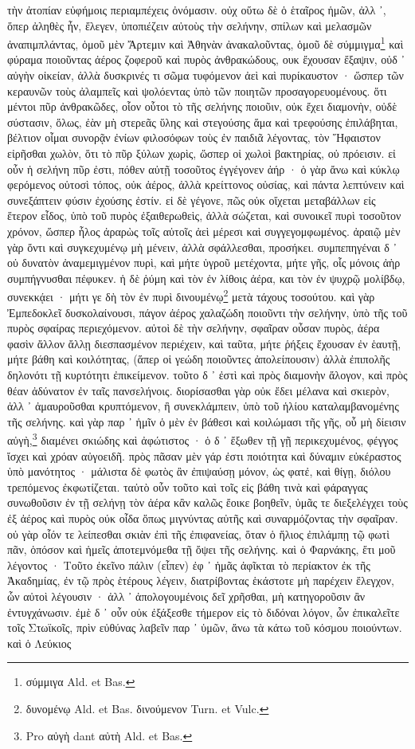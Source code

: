 \documentclass[a4paper, 11pt, oneside, polutonikogreek, german]{article}
\begin{document}
τὴν ἀτοπίαν εὐφήμοις περιαμπέχεις ὀνόμασιν. οὐχ οὕτω δὲ ὁ ἑταῖρος ἡμῶν, ἀλλ ᾽, ὅπερ ἀληθὲς ἦν, ἔλεγεν, ὑποπιέζειν αὐτοὺς τὴν σελήνην, σπίλων καὶ μελασμῶν ἀναπιμπλάντας, ὁμοῦ μὲν Ἄρτεμιν καὶ Ἀθηνὰν ἀνακαλοῦντας, ὁμοῦ δὲ σύμμιγμα\footnote{σύμμιγα Ald. et Bas.} καὶ φύραμα ποιοῦντας ἀέρος ζοφεροῦ καὶ πυρὸς ἀνθρακώδους, ουκ ἔχουσαν ἔξαψιν, οὐδ ᾽ αὐγὴν οἰκείαν, ἀλλὰ δυσκρινές τι σῶμα τυφόμενον ἀεὶ καὶ πυρίκαυστον · ὥσπερ τῶν κεραυνῶν τοὺς ἀλαμπεῖς καὶ ψολόεντας ὑπὸ τῶν ποιητῶν προσαγορευομένους. ὅτι μέντοι πῦρ ἀνθρακῶδες, οἷον οὗτοι τὸ τῆς σελήνης ποιοῦιν, οὐκ ἔχει διαμονὴν, οὐδὲ σύστασιν, ὅλως, ἐὰν μὴ στερεᾶς ὕλης καὶ στεγούσης ἅμα καὶ τρεφούσης ἐπιλάβηται, βέλτιον οἶμαι συνορᾷν ἐνίων φιλοσόφων τοὺς ἐν παιδιᾶ λέγοντας, τὸν Ἥφαιστον εἰρῆσθαι χωλὸν, ὅτι τὸ πῦρ ξύλων χωρὶς, ὥσπερ οἱ χωλοὶ βακτηρίας, οὐ πρόεισιν. εἰ οὖν ἡ σελήνη πῦρ ἐστι, πόθεν αὐτῇ τοσοῦτος ἐγγέγονεν ἀήρ · ὁ γὰρ ἄνω καὶ κύκλῳ φερόμενος οὑτοσὶ τόπος, οὐκ ἀέρος, ἀλλὰ κρείττονος οὐσίας, καὶ πάντα λεπτύνειν καὶ συνεξάπτειν φύσιν ἐχούσης ἐστίν. εἰ δὲ γέγονε, πῶς οὐκ οἴχεται μεταβάλλων εἰς ἕτερον εἶδος, ὑπὸ τοῦ πυρὸς ἐξαιθερωθεὶς, ἀλλὰ σώζεται, καὶ συνοικεῖ πυρὶ τοσοῦτον χρόνον, ὥσπερ ἧλος ἀραρὼς τοῖς αὐτοῖς ἀεὶ μέρεσι καὶ συγγεγομφωμένος. ἀραιῷ μὲν γὰρ ὄντι καὶ συγκεχυμένῳ μὴ μένειν, ἀλλὰ σφάλλεσθαι, προσήκει. συμπεπηγέναι δ ᾽ οὐ δυνατὸν ἀναμεμιγμένον πυρὶ, καὶ μήτε ὑγροῦ μετέχοντα, μήτε γῆς, οἷς μόνοις ἀὴρ συμπήγνυσθαι πέφυκεν. ἡ δὲ ῥύμη καὶ τὸν ἐν λίθοις ἀέρα, και τὸν ἐν ψυχρῷ μολίβδῳ, συνεκκᾴει · μήτι γε δὴ τὸν ἐν πυρὶ δινουμένῳ\footnote{δυνομένῳ Ald. et Bas. δινούμενον Turn. et Vulc.} μετὰ τάχους τοσούτου. καὶ γὰρ Ἐμπεδοκλεῖ δυσκολαίνουσι, πάγον ἀέρος χαλαζώδη ποιοῦντι τὴν σελήνην, ὑπὸ τῆς τοῦ πυρὸς σφαίρας περιεχόμενον. αὐτοὶ δὲ τὴν σελήνην, σφαῖραν οὖσαν πυρὸς, ἀέρα φασὶν ἄλλον ἄλλῃ διεσπασμένον περιέχειν, καὶ ταῦτα, μήτε ῥήξεις ἔχουσαν ἐν ἑαυτῇ, μήτε βάθη καὶ κοιλότητας, (ἅπερ οἱ γεώδη ποιοῦντες ἀπολείπουσιν) ἀλλὰ ἐπιπολῆς δηλονότι τῇ κυρτότητι ἐπικείμενον. τοῦτο δ ᾽ ἐστὶ καὶ πρὸς διαμονὴν ἄλογον, καὶ πρὸς θέαν ἀδύνατον ἐν ταῖς πανσελήνοις. διορίσασθαι γὰρ οὐκ ἔδει μέλανα καὶ σκιερὸν, ἀλλ ᾽ ἀμαυροῦσθαι κρυπτόμενον, ἢ συνεκλάμπειν, ὑπὸ τοῦ ἡλίου καταλαμβανομένης τῆς σελήνης. καὶ γὰρ παρ ᾽ ἡμῖν ὁ μὲν ἐν βάθεσι καὶ κοιλώμασι τῆς γῆς, οὗ μὴ δίεισιν αὐγὴ,\footnote{Pro αὐγὴ dant αὐτὴ Ald. et Bas.} διαμένει σκιώδης καὶ ἀφώτιστος · ὁ δ ᾽ ἔξωθεν τῇ γῇ περικεχυμένος, φέγγος ἴσχει καὶ χρόαν αὐγοειδῆ. πρὸς πᾶσαν μὲν γάρ ἐστι ποιότητα καὶ δύναμιν εὐκέραστος ὑπὸ μανότητος · μάλιστα δὲ φωτὸς ἂν ἐπιψαύσῃ μόνον, ὡς φατἐ, καὶ θίγῃ, διόλου τρεπόμενος ἐκφωτίζεται. ταὐτὸ οὖν τοῦτο καὶ τοῖς εἰς βάθη τινὰ καὶ φάραγγας συνωθοῦσιν ἐν τῇ σελήνῃ τὸν ἀέρα κἂν καλῶς ἔοικε βοηθεῖν, ὑμᾶς τε διεξελέγχει τοὺς ἐξ ἀέρος καὶ πυρὸς ούκ οἶδα ὅπως μιγνύντας αὐτῆς καὶ συναρμόζοντας τὴν σφαῖραν. οὐ γὰρ οἷόν τε λείπεσθαι σκιὰν ἐπὶ τῆς ἐπιφανείας, ὅταν ὁ ἥλιος ἐπιλάμπῃ τῷ φωτὶ πᾶν, ὁπόσον καὶ ἡμεῖς ἀποτεμνόμεθα τῇ ὄψει τῆς σελήνης. καὶ ὁ Φαρνάκης, ἔτι μοῦ λέγοντος · Τοῦτο ἐκεῖνο πάλιν (εἶπεν) ἐφ ᾽ ἡμᾶς ἀφῖκται τὸ περίακτον ἐκ τῆς Ἀκαδημίας, ἐν τῷ πρὸς ἑτέρους λέγειν, διατρίβοντας ἑκάστοτε μὴ παρέχειν ἔλεγχον, ὧν αὐτοὶ λέγουσιν · ἀλλ ᾽ ἀπολογουμένοις δεῖ χρῆσθαι, μὴ κατηγοροῦσιν ἂν ἐντυγχάνωσιν. ἐμὲ δ ᾽ οὖν οὐκ ἐξάξεσθε τήμερον εἰς τὸ διδόναι λόγον, ὧν ἐπικαλεῖτε τοῖς Στωϊκοῖς, πρὶν εὐθύνας λαβεῖν παρ ᾽ ὑμῶν, ἄνω τὰ κάτω τοῦ κόσμου ποιούντων. καὶ ὁ Λεύκιος 
\end{document}
